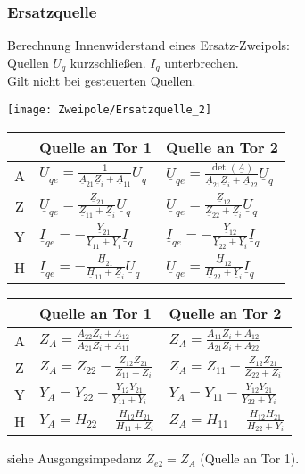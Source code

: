 \subsubsection{Ersatzquelle}
Berechnung Innenwiderstand eines Ersatz-Zweipols:\\ 
Quellen $U_q$ kurzschließen. $I_q$ unterbrechen.\\
Gilt nicht bei gesteuerten Quellen.\\
\begin{center}
	\texttt{[image: Zweipole/Ersatzquelle\_2]}
\end{center}
\begin{tabularx}{\columnwidth}{|c|X|X|}
	\hline
	 & Quelle an Tor 1 & Quelle an Tor 2 \\
	\hline A & $\underline{U}_{q e}=\frac{1}{\underline{A}_{21} \underline{Z}_i+\underline{A}_{11}} \underline{U}_q$ & $\underline{U}_{q e}=\frac{\operatorname{det}(\underline{A})}{\underline{A}_{21} \underline{Z}_i+\underline{A}_{22}} \underline{U}_q$ \\
	\hline Z & $\underline{U}_{q e}=\frac{\underline{Z}_{21}}{\underline{Z}_{11}+\underline{Z}_i} \underline{U}_q$ & $\underline{U}_{q e}=\frac{\underline{Z}_{12}}{\underline{Z}_{22}+\underline{Z}_i} \underline{U}_q$ \\
	\hline Y & $\underline{I}_{q e}=-\frac{\underline{Y}_{21}}{\underline{Y}_{11}+\underline{Y}_i} \underline{I}_q$ & $\underline{I}_{q e}=-\frac{\underline{Y}_{12}}{\underline{Y}_{22}+\underline{Y}_i} \underline{I}_q$ \\
	\hline H & $\underline{I}_{q e}=-\frac{\underline{H}_{21}}{\underline{H}_{11}+\underline{Z}_i} \underline{U}_q$ & $\underline{U}_{q e}=\frac{\underline{H}_{12}}{\underline{H}_{22}+\underline{Y}_i} \underline{I}_q$ \\
	\hline
\end{tabularx}
\begin{tabularx}{\columnwidth}{|c|X|X|}
	\hline
	        & Quelle an Tor 1 & Quelle an Tor 2 \\
	\hline
	A & $Z_A = \frac{A_{22}Z_i + A_{12}}{A_{21}Z_i + A_{11}}$ & $Z_A = \frac{A_{11}Z_i + A_{12}}{A_{21}Z_i + A_{22}}$ \\
	\hline
	Z & $Z_A = Z_{22} - \frac{Z_{12} Z_{21}}{Z_{11} + Z_i}$ & $Z_A = Z_{11} - \frac{Z_{12} Z_{21}}{Z_{22} + Z_i}$ \\
	\hline
	Y & $Y_A = Y_{22} - \frac{Y_{12} Y_{21}}{Y_{11} + Y_i}$ & $Y_A = Y_{11} - \frac{Y_{12} Y_{21}}{Y_{22} + Y_i}$ \\
	\hline
	H & $Y_A = H_{22} - \frac{H_{12} H_{21}}{H_{11} + Z_i}$ & $Z_A = H_{11} - \frac{H_{12} H_{21}}{H_{22} + Y_i}$ \\
	\hline
\end{tabularx}
siehe Ausgangsimpedanz $Z_{e2} = Z_A$ (Quelle an Tor 1).

